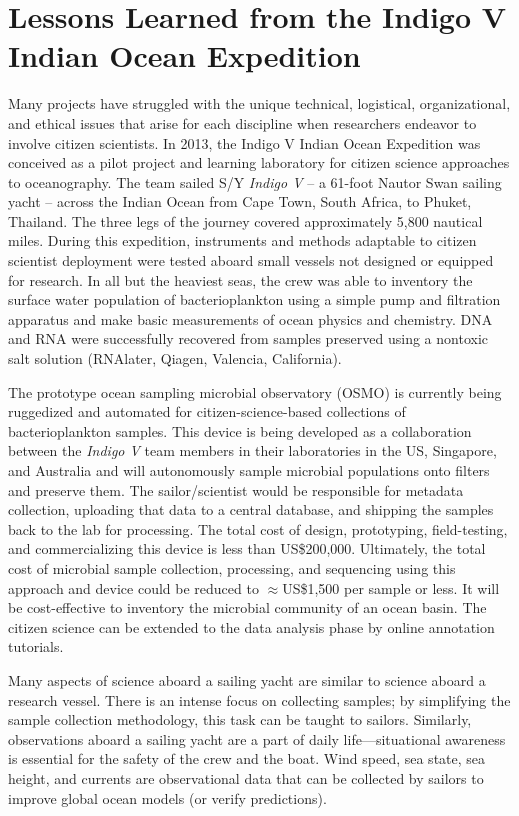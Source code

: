 \section{Lessons Learned from the Indigo V Indian Ocean Expedition}

Many projects have struggled with the unique technical, logistical, organizational, and ethical issues that arise for each discipline when researchers endeavor to involve citizen scientists. In 2013, the Indigo V Indian Ocean Expedition was conceived as a pilot project and learning laboratory for citizen science approaches to oceanography. The team sailed S/Y {\em Indigo V} -- a 61-foot Nautor Swan sailing yacht -- across the Indian Ocean from Cape Town, South Africa, to Phuket, Thailand. The three legs of the journey covered approximately 5,800 nautical miles. During this expedition, instruments and methods adaptable to citizen scientist deployment were tested aboard small vessels not designed or equipped for research. In all but the heaviest seas, the crew was able to inventory the surface water population of bacterioplankton using a simple pump and filtration apparatus and make basic measurements of ocean physics and chemistry. DNA and RNA were successfully recovered from samples preserved using a nontoxic salt solution (RNAlater, Qiagen, Valencia, California).

The prototype ocean sampling microbial observatory (OSMO) is currently being ruggedized and automated for citizen-science-based collections of bacterioplankton samples. This device is being developed as a collaboration between the {\em Indigo V} team members in their laboratories in the US, Singapore, and Australia and will autonomously sample microbial populations onto filters and preserve them. The sailor/scientist would be responsible for metadata collection, uploading that data to a central database, and shipping the samples back to the lab for processing. The total cost of design, prototyping, field-testing, and commercializing this device is less than US\$200,000. Ultimately, the total cost of microbial sample collection, processing, and sequencing using this approach and device could be reduced to $\approx$US\$1,500 per sample or less. It will be cost-effective to inventory the microbial community of an ocean basin. The citizen science can be extended to the data analysis phase by online annotation tutorials.

Many aspects of science aboard a sailing yacht are similar to science aboard a research vessel. There is an intense focus on collecting samples; by simplifying the sample collection methodology, this task can be taught to sailors. Similarly, observations aboard a sailing yacht are a part of daily life—situational awareness is essential for the safety of the crew and the boat. Wind speed, sea state, sea height, and currents are observational data that can be collected by sailors to improve global ocean models (or verify predictions).

